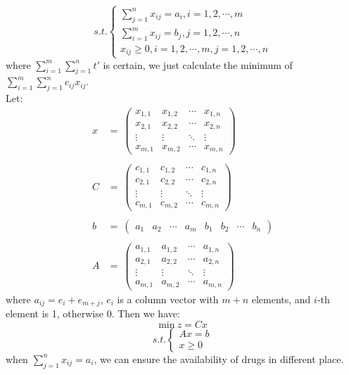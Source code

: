 $$
s.t. \left\{
\begin{array}{l}
  \sum_{j=1}^{n}x_{ij}=a_i,i=1,2,\cdots,m \\
  \sum_{i=1}^{m}x_{ij}=b_j,j=1,2,\cdots,n \\
  x_{ij}\geq 0,i=1,2,\cdots,m, j=1,2,\cdots,n
\end{array}\right.
$$
where $ \sum_{i=1}^{m}\sum_{j=1}^{n}t' $ is certain, 
we just calculate the minimum of 
$ \sum_{i=1}^{m}\sum_{j=1}^{n}c_{ij}x_{ij} $.\\
Let:
$$
\begin{array}{ll}
x & = ~\begin{pmatrix}
	  x_{1,1} & x_{1,2} & \cdots & x_{1,n} \\
	  x_{2,1} & x_{2,2} & \cdots & x_{2,n} \\
	  \vdots  & \vdots  & \ddots & \vdots  \\
	  x_{m,1} & x_{m,2} & \cdots & x_{m,n}
	 \end{pmatrix}\\\\
C & = ~\begin{pmatrix}
	  c_{1,1} & c_{1,2} & \cdots & c_{1,n} \\
	  c_{2,1} & c_{2,2} & \cdots & c_{2,n} \\
	  \vdots  & \vdots  & \ddots & \vdots  \\
	  c_{m,1} & c_{m,2} & \cdots & c_{m,n}
	 \end{pmatrix}\\\\
b & = ~\begin{pmatrix}
	  a_1 & a_2 & \cdots & a_m & b_1 & b_2 & \cdots & b_n
	 \end{pmatrix}\\\\
A & = ~\begin{pmatrix}
	  a_{1,1} & a_{1,2} & \cdots & a_{1,n} \\
	  a_{2,1} & a_{2,2} & \cdots & a_{2,n} \\
	  \vdots  & \vdots  & \ddots & \vdots  \\
	  a_{m,1} & a_{m,2} & \cdots & a_{m,n}
	 \end{pmatrix}
\end{array}
$$
where $ a_{ij}=e_i+e_{m+j} $, $ e_{i} $ is a column vector with
$ m+n $ elements, and $i$-th element is 1, otherwise 0. Then we
have:
$$
\mathrm{min}~z=Cx
$$
$$
s.t. \left\{\begin{array}{r}
  Ax=b\\
  x\geq 0
\end{array}\right.
$$
when $ \sum_{j=1}^{n}x_{ij}=a_i $, we can ensure the
availability of drugs in different place.